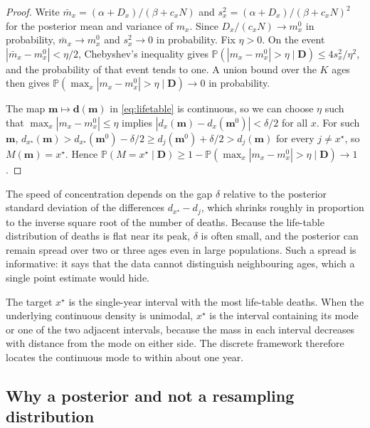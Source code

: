 \documentclass[12pt, letterpaper]{article}
\begin{document}
\begin{proof}
Write $\bar m_x = (\alpha + D_x)/(\beta + c_x N)$ and $s_x^2 = (\alpha + D_x)/(\beta + c_x N)^2$ for the posterior mean and variance of $m_x$. Since $D_x / (c_x N) \to m_x^0$ in probability, $\bar m_x \to m_x^0$ and $s_x^2 \to 0$ in probability. Fix $\eta > 0$. On the event $|\bar m_x - m_x^0| < \eta/2$, Chebyshev's inequality gives $\mathbb{P}(|m_x - m_x^0| > \eta \mid \bm{D}) \le 4 s_x^2 / \eta^2$, and the probability of that event tends to one. A union bound over the $K$ ages then gives $\mathbb{P}(\max_x |m_x - m_x^0| > \eta \mid \bm{D}) \to 0$ in probability.

The map $\bm{m} \mapsto \bm{d}(\bm{m})$ in \eqref{eq:lifetable} is continuous, so we can choose $\eta$ such that $\max_x |m_x - m_x^0| \le \eta$ implies $|d_x(\bm{m}) - d_x(\bm{m}^0)| < \delta/2$ for all $x$. For such $\bm{m}$, $d_{x^\star}(\bm{m}) > d_{x^\star}(\bm{m}^0) - \delta/2 \ge d_j(\bm{m}^0) + \delta/2 > d_j(\bm{m})$ for every $j \neq x^\star$, so $M(\bm{m}) = x^\star$. Hence $\mathbb{P}(M = x^\star \mid \bm{D}) \ge 1 - \mathbb{P}(\max_x |m_x - m_x^0| > \eta \mid \bm{D}) \to 1$.
\end{proof}

The speed of concentration depends on the gap $\delta$ relative to the posterior standard deviation of the differences $d_{x^\star} - d_j$, which shrinks roughly in proportion to the inverse square root of the number of deaths. Because the life-table distribution of deaths is flat near its peak, $\delta$ is often small, and the posterior can remain spread over two or three ages even in large populations. Such a spread is informative: it says that the data cannot distinguish neighbouring ages, which a single point estimate would hide.

The target $x^\star$ is the single-year interval with the most life-table deaths. When the underlying continuous density is unimodal, $x^\star$ is the interval containing its mode or one of the two adjacent intervals, because the mass in each interval decreases with distance from the mode on either side. The discrete framework therefore locates the continuous mode to within about one year.

\subsection{Why a posterior and not a resampling distribution}
\label{sec:why_posterior}
\end{document}

